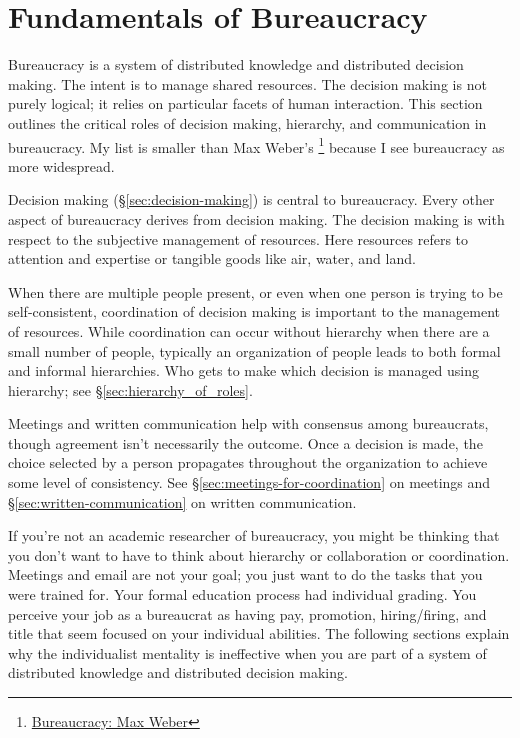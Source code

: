 \section{Fundamentals of Bureaucracy\label{fundamentals_of_b}}
  
Bureaucracy is a system of distributed knowledge and distributed decision making. The intent is to manage shared resources. The decision making is not purely logical; it relies on particular facets of human interaction. This section outlines the critical roles of decision making, hierarchy, and communication in bureaucracy. 
My list is smaller than Max Weber's \cite{2015_Weber}\footnote{\href{https://en.wikipedia.org/wiki/Bureaucracy\#Max_Weber}{Bureaucracy: Max Weber}} because I see bureaucracy as more widespread.

Decision making (\S\ref{sec:decision-making}) is central to bureaucracy. Every other aspect of bureaucracy derives from decision making. The decision making is with respect to the subjective management of resources. Here resources refers to attention and expertise or tangible goods like air, water, and land. 

When there are multiple people present, or even when one person is trying to be self-consistent, coordination of decision making is important to the management of resources. While coordination can occur without hierarchy when there are a small number of people, typically an organization of people leads to both formal and informal hierarchies. Who gets to make which decision is managed using hierarchy; see \S\ref{sec:hierarchy_of_roles}.

Meetings and written communication help with consensus among bureaucrats, though agreement isn't necessarily the outcome.
Once a decision is made, the choice selected by a person propagates throughout the organization to achieve some level of consistency. See \S\ref{sec:meetings-for-coordination} on meetings and \S\ref{sec:written-communication} on written communication.

If you're not an academic researcher of bureaucracy, you might be thinking that you don't want to have to think about hierarchy or collaboration or coordination. Meetings and email are not your goal; you just want to do the tasks that you were trained for. Your formal education process had individual grading. You perceive your job as a bureaucrat as having pay, promotion, hiring/firing, and title that  seem focused on your individual abilities. The following sections explain why the individualist mentality is ineffective when you are part of a  system of distributed knowledge and distributed decision making. 


